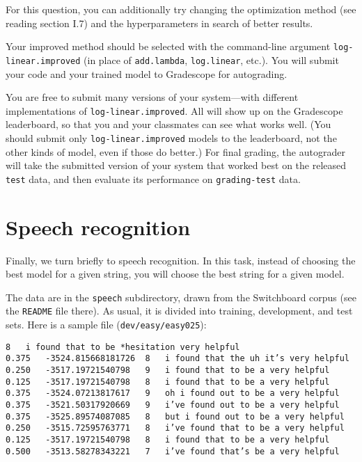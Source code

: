\documentclass[12pt]{article}
\theoremstyle{plain}
\theoremstyle{definition}
\theoremstyle{remark}
\begin{document}
\begin{enumerate}[(a)]
For this question, you can additionally try changing the optimization method (see reading section I.7) and the hyperparameters in search of better results.

Your improved method should be selected with the command-line argument \texttt{log-linear.improved} (in place of \texttt{add.lambda}, \texttt{log.linear}, etc.). You will submit your code and your trained model to Gradescope for autograding.

You are free to submit many versions of your system—with different implementations of \texttt{log-linear.improved}. All will show up on the Gradescope leaderboard, so that you and your classmates can see what works well. (You should submit only \texttt{log-linear.improved} models to the leaderboard, not the other kinds of model, even if those do better.) For final grading, the autograder will take the submitted version of your system that worked best on the released \texttt{test} data, and then evaluate its performance on \texttt{grading-test} data.
\end{enumerate}

\section{Speech recognition}

Finally, we turn briefly to speech recognition. In this task, instead of choosing the best model for a given string, you will choose the best string for a given model.

The data are in the \texttt{speech} subdirectory, drawn from the Switchboard corpus (see the \texttt{README} file there). As usual, it is divided into training, development, and test sets. Here is a sample file (\texttt{dev/easy/easy025}):

\begin{verbatim}
8   i found that to be *hesitation very helpful
0.375   -3524.815668181726  8   i found that the uh it’s very helpful
0.250   -3517.19721540798   9   i found that to be a very helpful
0.125   -3517.19721540798   8   i found that to be a very helpful
0.375   -3524.07213817617   9   oh i found out to be a very helpful
0.375   -3521.50317920669   9   i’ve found out to be a very helpful
0.375   -3525.89574087085   8   but i found out to be a very helpful
0.250   -3515.72595763771   8   i’ve found that to be a very helpful
0.125   -3517.19721540798   8   i found that to be a very helpful
0.500   -3513.58278343221   7   i’ve found that’s be a very helpful
\end{verbatim}
\end{document}
